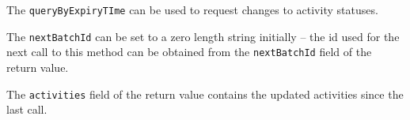 The \verb+queryByExpiryTIme+ can be used to request changes to activity statuses.

The \verb+nextBatchId+ can be set to a zero length string initially -- the id used for
the next call to this method can be obtained from the \verb+nextBatchId+ field of the return value.

The \verb+activities+ field of the return value contains the updated activities since the last call.
